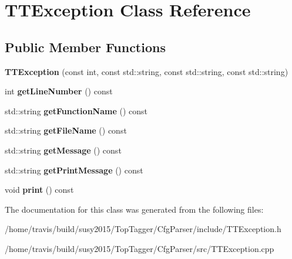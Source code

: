\hypertarget{classTTException}{\section{T\-T\-Exception Class Reference}
\label{classTTException}
}
\subsection*{Public Member Functions}
\begin{DoxyCompactItemize}
\item 
\hypertarget{classTTException_a9b4ef38abc1a5944eea011d63f7574e1}{{\bfseries T\-T\-Exception} (const int, const std\-::string, const std\-::string, const std\-::string)}\label{classTTException_a9b4ef38abc1a5944eea011d63f7574e1}

\item 
\hypertarget{classTTException_a0438e0a4023264e996288ac23581e0c3}{int {\bfseries get\-Line\-Number} () const }\label{classTTException_a0438e0a4023264e996288ac23581e0c3}

\item 
\hypertarget{classTTException_a342c0204e296e2fdae3b60b12d348592}{std\-::string {\bfseries get\-Function\-Name} () const }\label{classTTException_a342c0204e296e2fdae3b60b12d348592}

\item 
\hypertarget{classTTException_a3d7570a3fd6f0702069be6450e3c6a63}{std\-::string {\bfseries get\-File\-Name} () const }\label{classTTException_a3d7570a3fd6f0702069be6450e3c6a63}

\item 
\hypertarget{classTTException_ac37882c84da17e0e2c78637e97ba4b09}{std\-::string {\bfseries get\-Message} () const }\label{classTTException_ac37882c84da17e0e2c78637e97ba4b09}

\item 
\hypertarget{classTTException_a13d5fa6996d8add8df255df6415bc46a}{std\-::string {\bfseries get\-Print\-Message} () const }\label{classTTException_a13d5fa6996d8add8df255df6415bc46a}

\item 
\hypertarget{classTTException_ab67669a727365d75c4dbd63860bf7c85}{void {\bfseries print} () const }\label{classTTException_ab67669a727365d75c4dbd63860bf7c85}

\end{DoxyCompactItemize}


The documentation for this class was generated from the following files\-:\begin{DoxyCompactItemize}
\item 
/home/travis/build/susy2015/\-Top\-Tagger/\-Cfg\-Parser/include/T\-T\-Exception.\-h\item 
/home/travis/build/susy2015/\-Top\-Tagger/\-Cfg\-Parser/src/T\-T\-Exception.\-cpp\end{DoxyCompactItemize}
